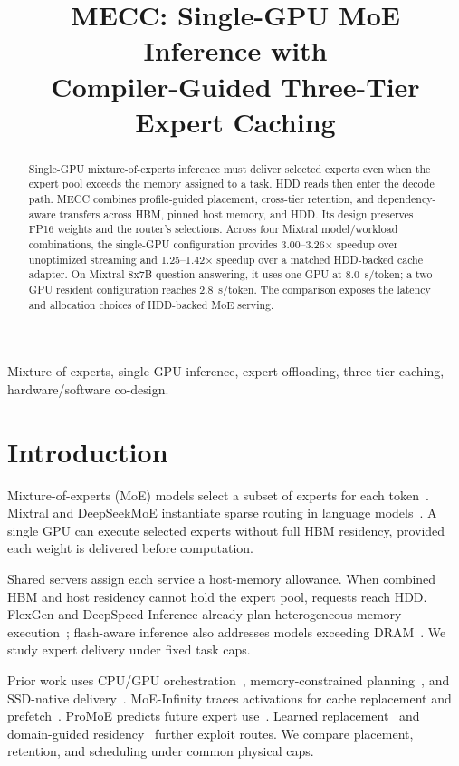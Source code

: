 \documentclass[conference,9pt,letterpaper]{IEEEtran}
\title{MECC: Single-GPU MoE Inference with\protect\\Compiler-Guided Three-Tier Expert Caching}
\author{}
\begin{document}
\maketitle
\begin{abstract}
Single-GPU mixture-of-experts inference must deliver selected experts even when the expert pool exceeds the memory assigned to a task. HDD reads then enter the decode path. MECC combines profile-guided placement, cross-tier retention, and dependency-aware transfers across HBM, pinned host memory, and HDD. Its design preserves FP16 weights and the router's selections. Across four Mixtral model/workload combinations, the single-GPU configuration provides 3.00--3.26$\times$ speedup over unoptimized streaming and 1.25--1.42$\times$ speedup over a matched HDD-backed cache adapter. On Mixtral-8x7B question answering, it uses one GPU at 8.0~s/token; a two-GPU resident configuration reaches 2.8~s/token. The comparison exposes the latency and allocation choices of HDD-backed MoE serving.
\end{abstract}
\begin{IEEEkeywords}
Mixture of experts, single-GPU inference, expert offloading, three-tier caching, hardware/software co-design.
\end{IEEEkeywords}

\section{Introduction}
Mixture-of-experts (MoE) models select a subset of experts for each token~\cite{shazeer,switch,gshard}. Mixtral and DeepSeekMoE instantiate sparse routing in language models~\cite{mixtral,deepseekmoe}. A single GPU can execute selected experts without full HBM residency, provided each weight is delivered before computation.

Shared servers assign each service a host-memory allowance. When combined HBM and host residency cannot hold the expert pool, requests reach HDD. FlexGen and DeepSpeed Inference already plan heterogeneous-memory execution~\cite{flexgen,dsinference}; flash-aware inference also addresses models exceeding DRAM~\cite{llmflash}. We study expert delivery under fixed task caps.

Prior work uses CPU/GPU orchestration~\cite{fiddler}, memory-constrained planning~\cite{lightning}, and SSD-native delivery~\cite{ssdllama}. MoE-Infinity traces activations for cache replacement and prefetch~\cite{moeinfinity}. ProMoE predicts future expert use~\cite{promoe}. Learned replacement~\cite{flashmoe} and domain-guided residency~\cite{core} further exploit routes. We compare placement, retention, and scheduling under common physical caps.
\end{document}
